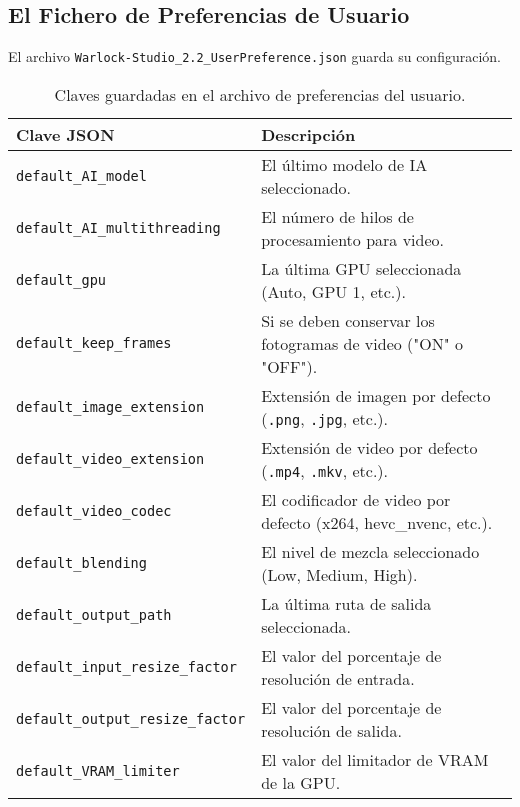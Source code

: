 \documentclass[11pt, a4paper]{article}
\newcommand{\inlinecode}[1]{\colorbox{WarlockLightGray}{\small\texttt{#1}}}
\begin{document}
\subsection{El Fichero de Preferencias de Usuario}
El archivo \inlinecode{Warlock-Studio_2.2_UserPreference.json} guarda su configuración.
\begin{table}[H]
    \centering
    \small %
    \begin{tabularx}{\textwidth}{l X}
        \toprule
        \textbf{Clave JSON} & \textbf{Descripción} \\
        \midrule
        \texttt{default\_AI\_model} & El último modelo de IA seleccionado. \\
        \texttt{default\_AI\_multithreading} & El número de hilos de procesamiento para video. \\
        \texttt{default\_gpu} & La última GPU seleccionada (Auto, GPU 1, etc.). \\
        \texttt{default\_keep\_frames} & Si se deben conservar los fotogramas de video ("ON" o "OFF"). \\
        \texttt{default\_image\_extension} & Extensión de imagen por defecto (\texttt{.png}, \texttt{.jpg}, etc.). \\
        \texttt{default\_video\_extension} & Extensión de video por defecto (\texttt{.mp4}, \texttt{.mkv}, etc.). \\
        \texttt{default\_video\_codec} & El codificador de video por defecto (x264, hevc\_nvenc, etc.). \\
        \texttt{default\_blending} & El nivel de mezcla seleccionado (Low, Medium, High). \\
        \texttt{default\_output\_path} & La última ruta de salida seleccionada. \\
        \texttt{default\_input\_resize\_factor} & El valor del porcentaje de resolución de entrada. \\
        \texttt{default\_output\_resize\_factor} & El valor del porcentaje de resolución de salida. \\
        \texttt{default\_VRAM\_limiter} & El valor del limitador de VRAM de la GPU. \\
        \bottomrule
    \end{tabularx}
    \caption{Claves guardadas en el archivo de preferencias del usuario.}
\end{table}
\end{document}
